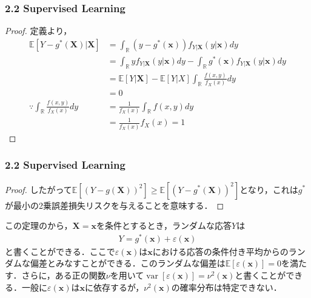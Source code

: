 \documentclass[dvipdfmx,cjk]{beamer}
\theoremstyle{example}
\DeclareMathOperator{\Var}{var}
\begin{document}
\begin{frame}
    \frametitle{2.2 Supervised Learning}
    \begin{proof}
        定義より，
        \begin{align*}
            \mathbb{E}[Y-g^*(\boldsymbol{X})|\boldsymbol{X}] & =\int_\mathbb{R}(y-g^*(\boldsymbol{x}))f_{Y|\boldsymbol{X}}(y|\boldsymbol{x})dy                                                      \\
                                                             & =\int_\mathbb{R}yf_{Y|\boldsymbol{X}}(y|\boldsymbol{x})dy-\int_\mathbb{R}g^*(\boldsymbol{x})f_{Y|\boldsymbol{X}}(y|\boldsymbol{x})dy \\
                                                             & = \mathbb{E}[Y|\boldsymbol{X}]-\mathbb{E}[Y|X]\int_\mathbb{R}\frac{f(x,y)}{f_X(x)}dy                                                 \\
                                                             & =0                                                                                                                                   \\
            \because\int_\mathbb{R}\frac{f(x,y)}{f_X(x)}dy   & =\frac{1}{f_X(x)}\int_\mathbb{R}f(x,y)dy                                                                                             \\
                                                             & =\frac{1}{f_X(x)}f_X(x)=1
        \end{align*}
        \renewcommand{\qedsymbol}{}
    \end{proof}
\end{frame}

\begin{frame}
    \frametitle{2.2 Supervised Learning}
    \begin{proof}
        したがって$\mathbb{E}[(Y-g(\boldsymbol{X}))^2]\geq\mathbb{E}[(Y-g^*(\boldsymbol{X}))^2]$となり，これは$g^*$が最小の2乗誤差損失リスクを与えることを意味する．
    \end{proof}
    この定理のから，$\boldsymbol{X}=\boldsymbol{x}$を条件とするとき，ランダムな応答$Y$は
    \begin{align*}
        Y=g^*(\boldsymbol{x})+\varepsilon(\boldsymbol{x})
    \end{align*}
    と書くことができる．ここで$\varepsilon(\boldsymbol{x})$は$\boldsymbol{x}$における応答の条件付き平均からのランダムな偏差とみなすことができる．このランダムな偏差は$\mathbb{E}[\varepsilon(\boldsymbol{x})]=0$を満たす．さらに，ある正の関数$\nu$を用いて$\Var[\varepsilon(\boldsymbol{x})]=\nu^2(\boldsymbol{x})$と書くことができる．一般に$\varepsilon(\boldsymbol{x})$は$\boldsymbol{x}$に依存するが，$\nu^2(\boldsymbol{x})$の確率分布は特定できない．
\end{frame}
\end{document}
